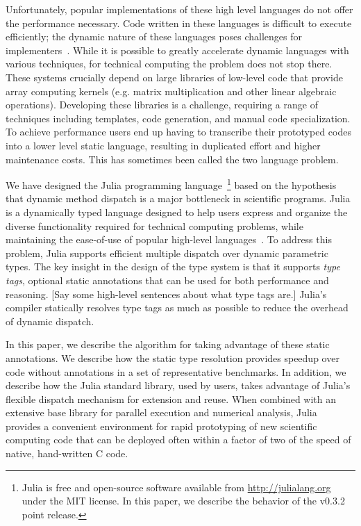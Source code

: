Unfortunately, popular implementations of these high level languages do not offer the performance necessary. Code written in these languages is difficult to execute efficiently; the dynamic nature of these languages poses challenges for
implementers~\cite{Joisha2001,Joisha2006,Seljebotn2009}. While it is possible
to greatly accelerate dynamic languages with various techniques, for
technical computing the problem does not stop there. These systems
crucially depend on large libraries of low-level code that provide array
computing kernels (e.g. matrix multiplication and other linear algebraic
operations). Developing these libraries is a challenge, requiring a range of
techniques including templates, code generation, and manual code
specialization. To achieve performance users end up having to transcribe their prototyped codes into a lower level static language, resulting in duplicated effort and higher maintenance costs. This has sometimes been called the two language problem.

We have designed the Julia programming language~\footnote{Julia is free and open-source software available from
\url{http://julialang.org} under the MIT license. In this paper, we describe
the behavior of the v0.3.2 point release.} based on the hypothesis that dynamic method dispatch is a major bottleneck in scientific programs. Julia is a dynamically typed language designed to help users express and organize the diverse functionality required for technical computing problems, while maintaining the ease-of-use of popular high-level languages~\cite{Bezanson2012,Bezanson2014b}. To address this problem, Julia supports efficient multiple dispatch over dynamic parametric types. The key insight in the design of the type system is that it supports \emph{type tags}, optional static annotations that can be used for both performance and reasoning. [Say some high-level sentences about what type tags are.]
Julia's compiler statically resolves type tags as much as possible to reduce the overhead of dynamic dispatch.

In this paper, we describe the algorithm for taking advantage of these static annotations. We describe how the static type resolution provides  speedup over code without annotations in a set of representative benchmarks. In addition, we describe how the Julia standard library, used by  users, takes advantage of Julia's flexible dispatch mechanism for extension and reuse. When combined with an extensive base library for parallel execution and numerical analysis, Julia provides a convenient environment for rapid prototyping of new scientific computing code that can be deployed often within a factor of two of the speed of native, hand-written C code.

